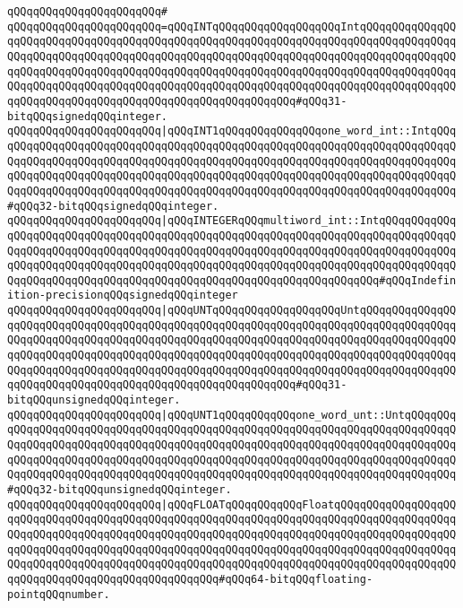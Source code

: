 \verb|qQQqqQQqqQQqqQQqqQQqqQQq#|\newline
\verb|qQQqqQQqqQQqqQQqqQQqqQQq=qQQqINTqQQqqQQqqQQqqQQqqQQqIntqQQqqQQqqQQqqQQqqQQqqQQqqQQqqQQqqQQqqQQqqQQqqQQqqQQqqQQqqQQqqQQqqQQqqQQqqQQqqQQqqQQqqQQqqQQqqQQqqQQqqQQqqQQqqQQqqQQqqQQqqQQqqQQqqQQqqQQqqQQqqQQqqQQqqQQqqQQqqQQqqQQqqQQqqQQqqQQqqQQqqQQqqQQqqQQqqQQqqQQqqQQqqQQqqQQqqQQqqQQqqQQqqQQqqQQqqQQqqQQqqQQqqQQqqQQqqQQqqQQqqQQqqQQqqQQqqQQqqQQqqQQqqQQqqQQqqQQqqQQqqQQqqQQqqQQqqQQqqQQqqQQqqQQqqQQqqQQqqQQq#qQQq31-bitqQQqsignedqQQqinteger.|\newline
\verb|qQQqqQQqqQQqqQQqqQQqqQQq|\verb#|qQQqINT1qQQqqQQqqQQqqQQqone_word_int::IntqQQqqQQqqQQqqQQqqQQqqQQqqQQqqQQqqQQqqQQqqQQqqQQqqQQqqQQqqQQqqQQqqQQqqQQqqQQqqQQqqQQqqQQqqQQqqQQqqQQqqQQqqQQqqQQqqQQqqQQqqQQqqQQqqQQqqQQqqQQqqQQqqQQqqQQqqQQqqQQqqQQqqQQqqQQqqQQqqQQqqQQqqQQqqQQqqQQqqQQqqQQqqQQqqQQqqQQqqQQqqQQqqQQqqQQqqQQqqQQqqQQqqQQqqQQqqQQqqQQqqQQqqQQqqQQqqQQqqQQqqQQq#\verb|#qQQq32-bitqQQqsignedqQQqinteger.|\newline
\verb|qQQqqQQqqQQqqQQqqQQqqQQq|\verb#|qQQqINTEGERqQQqmultiword_int::IntqQQqqQQqqQQqqQQqqQQqqQQqqQQqqQQqqQQqqQQqqQQqqQQqqQQqqQQqqQQqqQQqqQQqqQQqqQQqqQQqqQQqqQQqqQQqqQQqqQQqqQQqqQQqqQQqqQQqqQQqqQQqqQQqqQQqqQQqqQQqqQQqqQQqqQQqqQQqqQQqqQQqqQQqqQQqqQQqqQQqqQQqqQQqqQQqqQQqqQQqqQQqqQQqqQQqqQQqqQQqqQQqqQQqqQQqqQQqqQQqqQQqqQQqqQQqqQQqqQQqqQQqqQQqqQQqqQQqqQQq#\verb|#qQQqIndefinition-precisionqQQqsignedqQQqinteger|\newline
\verb|qQQqqQQqqQQqqQQqqQQqqQQq|\verb#|qQQqUNTqQQqqQQqqQQqqQQqqQQqUntqQQqqQQqqQQqqQQqqQQqqQQqqQQqqQQqqQQqqQQqqQQqqQQqqQQqqQQqqQQqqQQqqQQqqQQqqQQqqQQqqQQqqQQqqQQqqQQqqQQqqQQqqQQqqQQqqQQqqQQqqQQqqQQqqQQqqQQqqQQqqQQqqQQqqQQqqQQqqQQqqQQqqQQqqQQqqQQqqQQqqQQqqQQqqQQqqQQqqQQqqQQqqQQqqQQqqQQqqQQqqQQqqQQqqQQqqQQqqQQqqQQqqQQqqQQqqQQqqQQqqQQqqQQqqQQqqQQqqQQqqQQqqQQqqQQqqQQqqQQqqQQqqQQqqQQqqQQqqQQqqQQqqQQqqQQqqQQqqQQq#\verb|#qQQq31-bitqQQqunsignedqQQqinteger.|\newline
\verb|qQQqqQQqqQQqqQQqqQQqqQQq|\verb#|qQQqUNT1qQQqqQQqqQQqone_word_unt::UntqQQqqQQqqQQqqQQqqQQqqQQqqQQqqQQqqQQqqQQqqQQqqQQqqQQqqQQqqQQqqQQqqQQqqQQqqQQqqQQqqQQqqQQqqQQqqQQqqQQqqQQqqQQqqQQqqQQqqQQqqQQqqQQqqQQqqQQqqQQqqQQqqQQqqQQqqQQqqQQqqQQqqQQqqQQqqQQqqQQqqQQqqQQqqQQqqQQqqQQqqQQqqQQqqQQqqQQqqQQqqQQqqQQqqQQqqQQqqQQqqQQqqQQqqQQqqQQqqQQqqQQqqQQqqQQqqQQqqQQqqQQqqQQq#\verb|#qQQq32-bitqQQqunsignedqQQqinteger.|\newline
\verb|qQQqqQQqqQQqqQQqqQQqqQQq|\verb#|qQQqFLOATqQQqqQQqqQQqFloatqQQqqQQqqQQqqQQqqQQqqQQqqQQqqQQqqQQqqQQqqQQqqQQqqQQqqQQqqQQqqQQqqQQqqQQqqQQqqQQqqQQqqQQqqQQqqQQqqQQqqQQqqQQqqQQqqQQqqQQqqQQqqQQqqQQqqQQqqQQqqQQqqQQqqQQqqQQqqQQqqQQqqQQqqQQqqQQqqQQqqQQqqQQqqQQqqQQqqQQqqQQqqQQqqQQqqQQqqQQqqQQqqQQqqQQqqQQqqQQqqQQqqQQqqQQqqQQqqQQqqQQqqQQqqQQqqQQqqQQqqQQqqQQqqQQqqQQqqQQqqQQqqQQqqQQqqQQqqQQqqQQqqQQqqQQq#\verb|#qQQq64-bitqQQqfloating-pointqQQqnumber.|\newline

